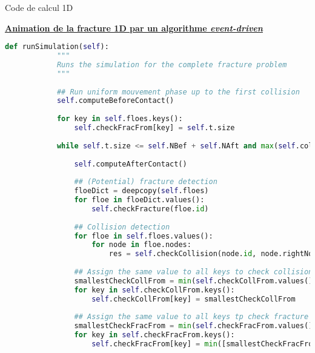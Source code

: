 \begin{frame}[fragile]{Code de calcul 1D}

	\centering
    \textcolor{mygray}{\href{run:../../../../Share/FracSimu.gif}{\textbf{Animation de la fracture 1D par un algorithme \emph{event-driven}}}}


    \tiny
    \begin{lstlisting}[language=Python,breaklines,caption={Code de simulation 1D},captionpos=b,label={code}]
        def runSimulation(self):
            """
            Runs the simulation for the complete fracture problem
            """
    
            ## Run uniform mouvement phase up to the first collision
            self.computeBeforeContact()
    
            for key in self.floes.keys():
                self.checkFracFrom[key] = self.t.size
    
            while self.t.size <= self.NBef + self.NAft and max(self.collCount.values()) < 1000:
    
                self.computeAfterContact()
    
                ## (Potential) fracture detection 
                floeDict = deepcopy(self.floes)
                for floe in floeDict.values():
                    self.checkFracture(floe.id)
    
                ## Collision detection 
                for floe in self.floes.values():
                    for node in floe.nodes:
                        res = self.checkCollision(node.id, node.rightNode)
    
                ## Assign the same value to all keys to check collision from now on
                smallestCheckCollFrom = min(self.checkCollFrom.values())
                for key in self.checkCollFrom.keys():
                    self.checkCollFrom[key] = smallestCheckCollFrom
    
                ## Assign the same value to all keys tp check fracture from now on
                smallestCheckFracFrom = min(self.checkFracFrom.values())
                for key in self.checkFracFrom.keys():
                    self.checkFracFrom[key] = min([smallestCheckFracFrom, smallestCheckCollFrom])
    \end{lstlisting}
    \normalsize

\end{frame}
    
    

